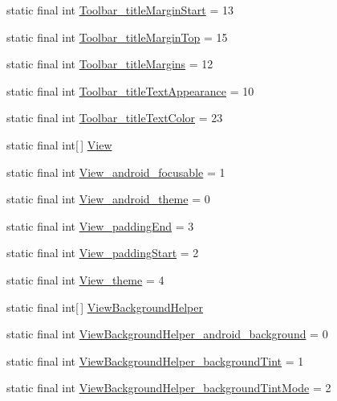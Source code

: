 \begin{DoxyCompactItemize}
static final int \hyperlink{classcheck_1_1test_1_1_r_1_1styleable_a4a55fbefdcf687934e2c57f3a12cfb1d}{Toolbar\+\_\+title\+Margin\+Start} = 13
\item 
static final int \hyperlink{classcheck_1_1test_1_1_r_1_1styleable_a90b959cc7186d99612ffd6e5a1ded83b}{Toolbar\+\_\+title\+Margin\+Top} = 15
\item 
static final int \hyperlink{classcheck_1_1test_1_1_r_1_1styleable_a198e72fff825b1e6049c5dbbb9265945}{Toolbar\+\_\+title\+Margins} = 12
\item 
static final int \hyperlink{classcheck_1_1test_1_1_r_1_1styleable_a57757c8f75dedaa99dff594776088620}{Toolbar\+\_\+title\+Text\+Appearance} = 10
\item 
static final int \hyperlink{classcheck_1_1test_1_1_r_1_1styleable_ad2cf34c85cd9f2275558a3082471052a}{Toolbar\+\_\+title\+Text\+Color} = 23
\item 
static final int\mbox{[}$\,$\mbox{]} \hyperlink{classcheck_1_1test_1_1_r_1_1styleable_a649d1cf46b1780fca1185680fabbb1e1}{View}
\item 
static final int \hyperlink{classcheck_1_1test_1_1_r_1_1styleable_a92aa4c0c838d8cd1dbd8bbcbdcdaa904}{View\+\_\+android\+\_\+focusable} = 1
\item 
static final int \hyperlink{classcheck_1_1test_1_1_r_1_1styleable_a183c98f0eb7fd5d876f22dc7611d3e5a}{View\+\_\+android\+\_\+theme} = 0
\item 
static final int \hyperlink{classcheck_1_1test_1_1_r_1_1styleable_a77eb809eaf7c2d90a2605681fd89ab20}{View\+\_\+padding\+End} = 3
\item 
static final int \hyperlink{classcheck_1_1test_1_1_r_1_1styleable_a802b6e1c0429edd87c36d355b095d838}{View\+\_\+padding\+Start} = 2
\item 
static final int \hyperlink{classcheck_1_1test_1_1_r_1_1styleable_a2c622119b55ec8f1cab226d62d3022bf}{View\+\_\+theme} = 4
\item 
static final int\mbox{[}$\,$\mbox{]} \hyperlink{classcheck_1_1test_1_1_r_1_1styleable_ae6adc75d344e9e404acc591e2de26ff7}{View\+Background\+Helper}
\item 
static final int \hyperlink{classcheck_1_1test_1_1_r_1_1styleable_aa2313bf1378b158e67edf755744cb72f}{View\+Background\+Helper\+\_\+android\+\_\+background} = 0
\item 
static final int \hyperlink{classcheck_1_1test_1_1_r_1_1styleable_a0d48384e17b37e236f9349fd6ec90051}{View\+Background\+Helper\+\_\+background\+Tint} = 1
\item 
static final int \hyperlink{classcheck_1_1test_1_1_r_1_1styleable_a45ca8f11081793216f1476f206f628e7}{View\+Background\+Helper\+\_\+background\+Tint\+Mode} = 2

\end{DoxyCompactItemize}
